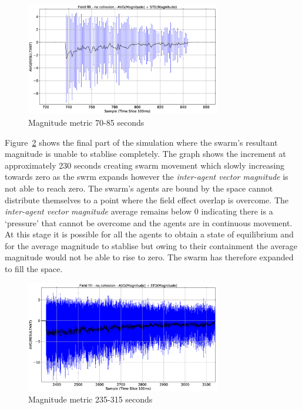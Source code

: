 \documentclass[10pt,journal,letterpaper,twoside]{IEEEtran}
\begin{document}
\begin{figure}
\begin{center}
\includegraphics[width=8.5cm]{figures/REPELFILL5055-MAG-2-3}
\end{center}
\caption{Magnitude metric 70-85 seconds\label{emerge:REPELFILL5055-MAG-2-3}}
\end{figure}

Figure~\ref{emerge:REPELFILL5055-MAG-8} shows the final part of the simulation where the swarm's resultant magnitude is unable to stablise completely. The graph shows the increment at approximately 230 seconds creating swarm movement which slowly increasing towards zero as the swrm expands however the \textit{inter-agent vector magnitude} is not able to reach zero. The swarm's agents are bound by the space cannot distribute themselves to a point where the field effect overlap is overcome. The \textit{inter-agent vector magnitude} average remains below 0 indicating there is a `pressure' that cannot be overcome and the agents are in continuous movement. At this stage it is possible for all the agents to obtain a state of equilibrium and for the average magnitude to stablise but owing to their containment the average magnitude would not be able to rise to zero. The swarm has therefore expanded to fill the space.

\begin{figure}
\begin{center}
\includegraphics[width=8.5cm]{figures/REPELFILL5055-MAG-8}
\end{center}
\caption{Magnitude metric 235-315 seconds\label{emerge:REPELFILL5055-MAG-8}}
\end{figure}
\end{document}
